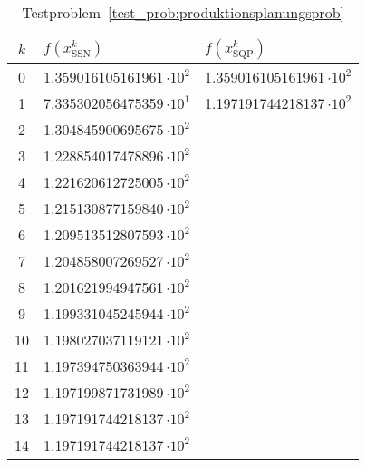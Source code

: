 \begin{table}[h]
\centering
\begin{tabular*}{0.75\linewidth}{@{\extracolsep{\fill}}cll}
  \toprule
    $k$ & $f(x^k_\text{SSN})$ & $f(x^k_\text{SQP})$ \\
  \midrule
   0 & 1.359016105161961\,$\cdot10^{2}$ & 1.359016105161961\,$\cdot10^{2}$ \\
   1 & 7.335302056475359\,$\cdot10^{1}$ & 1.197191744218137\,$\cdot10^{2}$ \\
   2 & 1.304845900695675\,$\cdot10^{2}$ & \\
   3 & 1.228854017478896\,$\cdot10^{2}$ & \\
   4 & 1.221620612725005\,$\cdot10^{2}$ & \\
   5 & 1.215130877159840\,$\cdot10^{2}$ & \\
   6 & 1.209513512807593\,$\cdot10^{2}$ & \\
   7 & 1.204858007269527\,$\cdot10^{2}$ & \\
   8 & 1.201621994947561\,$\cdot10^{2}$ & \\
   9 & 1.199331045245944\,$\cdot10^{2}$ & \\
   10 & 1.198027037119121\,$\cdot10^{2}$ & \\
   11 & 1.197394750363944\,$\cdot10^{2}$ & \\
   12 & 1.197199871731989\,$\cdot10^{2}$ & \\
   13 & 1.197191744218137\,$\cdot10^{2}$ & \\
   14 & 1.197191744218137\,$\cdot10^{2}$ & \\
  \bottomrule
\end{tabular*}
\caption{Testproblem~\ref{test_prob:produktionsplanungsprob}}
\end{table}
